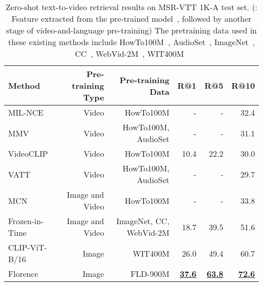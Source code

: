\documentclass{article}
\begin{document}
\begin{table*}[ht]
\centering
\setlength{\tabcolsep}{10.5pt}
\small
\renewcommand{\arraystretch}{1.35}
\begin{tabular}{l|r|r|rrr}
\toprule
Method & Pre-training Type & Pre-training Data & R@1 & R@5 & R@10 \\
\midrule
MIL-NCE~\cite{miech2020end} & Video & HowTo100M & - & - & 32.4 \\
MMV~\cite{alayrac2020self} & Video & HowTo100M, AudioSet & - & - & 31.1 \\
VideoCLIP~\cite{xu2021videoclip} & Video & HowTo100M & 10.4 & 22.2 & 30.0 \\
VATT~\cite{akbari2021vatt} & Video & HowTo100M, AudioSet & - & - & 29.7 \\
MCN~\cite{chen2021multimodal} & Image and Video & HowTo100M & - & - & 33.8 \\
Frozen-in-Time~\cite{bain2021frozen} & Image and Video & ImageNet,
CC, WebVid-2M & 18.7 & 39.5 & 51.6 \\
\midrule
CLIP-ViT-B/16~\cite{radford2021learning} & Image & WIT400M & 26.0 & 49.4
& 60.7 \\
Florence & Image & FLD-900M & \underline{\bf{37.6}} & \underline{\bf{63.8}} & \underline{\bf{72.6}}
\\
\bottomrule
\end{tabular}
\caption{Zero-shot text-to-video retrieval results on MSR-VTT 1K-A test set. (: Feature extracted from the pre-trained model~\cite{miech2020end}, followed by another stage of video-and-language pre-training) The pretraining data used in these existing methods include HowTo100M~\cite{miech2019howto100m}, AudioSet~\cite{gemmeke2017audio},  ImageNet~\cite{deng2009imagenet}, CC~\cite{sharma2018conceptual},  WebVid-2M~\cite{bain2021frozen}, WIT400M~\cite{radford2021learning}}
\label{tab:t2v_retrieval_results}
\end{table*}
\end{document}
